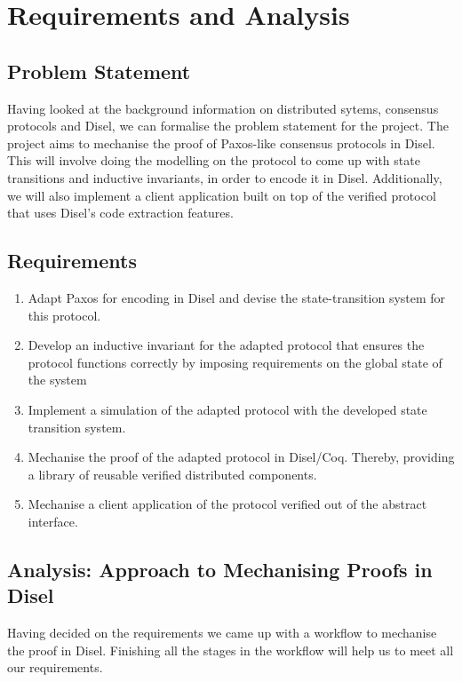 \chapter{Requirements and Analysis}

\section{Problem Statement}
Having looked at the background information on distributed sytems, consensus protocols
and Disel, we can formalise the problem statement for the project.
The project aims to mechanise the proof of Paxos-like consensus protocols in
Disel. This will involve doing the modelling on the protocol to come up with
state transitions and inductive invariants, in order to encode it in Disel.
Additionally, we will also implement a client application built on top
of the verified protocol that uses Disel's code extraction features.

\section{Requirements}
\begin{enumerate}
  \item Adapt Paxos for encoding in Disel and devise the state-transition system for this protocol.
  \item Develop an inductive invariant for the adapted protocol that
    ensures the protocol functions correctly by imposing requirements on the global state of the system
  \item Implement a simulation of the adapted protocol with the developed state transition system.
  \item Mechanise the proof of the adapted protocol in Disel/Coq.
    Thereby, providing a library of reusable verified distributed components.
  \item Mechanise a client application of the protocol verified out of the abstract interface.
\end{enumerate}

\vspace{-4mm}
\section{Analysis: Approach to Mechanising Proofs in Disel}
Having decided on the requirements we came up with a workflow to
mechanise the proof in Disel. Finishing all the stages in the workflow
will help us to meet all our requirements.

